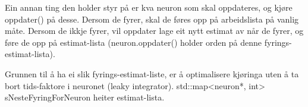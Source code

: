 Ein annan ting den holder styr på er kva neuron som skal oppdateres, og kjøre oppdater() på desse. Dersom de fyrer, skal de føres opp på arbeidslista på vanlig måte. Dersom de ikkje fyrer, vil oppdater lage eit nytt estimat av når de fyrer, og føre de opp på estimat-lista (neuron.oppdater() holder orden på denne fyrings-estimat-lista).

Grunnen til å ha ei slik fyrings-estimat-liste, er å optimalisere kjøringa uten å ta bort tids-faktore i neuronet (leaky integrator).
std::map<neuron*, int> sNesteFyringForNeuron heiter estimat-lista.

